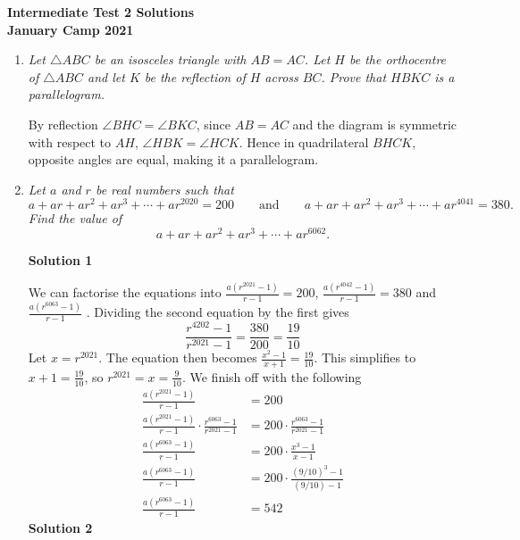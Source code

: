 \documentclass{article}
\begin{document}
\thispagestyle{empty}

\begin{center}
  \textbf{\Large Intermediate Test 2 Solutions}
  \\ \vspace{1em}
  \textbf{\large January Camp 2021}
\end{center}

\vspace{24pt}

\begin{enumerate}[1.]

  \item %
  {\itshape Let $\triangle ABC$ be an isosceles triangle with $AB = AC$. Let $H$ be the orthocentre of $\triangle ABC$ and let $K$ be the reflection of $H$ across $BC$. Prove that $HBKC$ is a parallelogram.}
  
  By reflection $\angle BHC = \angle BKC$, since $AB = AC$ and the diagram is symmetric with respect to $AH$, $\angle HBK = \angle HCK$. Hence in quadrilateral $BHCK$, opposite angles are equal, making it a parallelogram.
  
  \item %
  {\itshape Let $a$ and $r$ be real numbers such that
  \[ a +ar +ar^2 +ar^3 +\dotsb +ar^{2020} = 200 \qquad\text{and}\qquad a +ar +ar^2 +ar^3 +\dotsb +ar^{4041} = 380. \]
  Find the value of
  \[ a +ar +ar^2 +ar^3 +\dotsb +ar^{6062}. \]}
  
  \textbf{Solution 1}\newline

We can factorise the equations into $\frac{a(r^{2021} - 1)}{r - 1} = 200$, $\frac{a(r^{4042} - 1)}{r - 1} = 380$ and $\frac{a(r^{6063} - 1)}{r - 1}$ . Dividing the second equation by the first gives $$\frac{r^{4202} - 1}{r^{2021} - 1} = \frac{380}{200} = \frac{19}{10}$$ Let $x = r^{2021}$. The equation then becomes $\frac{x^2 - 1}{x + 1} = \frac{19}{10}$. This simplifies to $x + 1 = \frac{19}{10}$, so $r^{2021} = x = \frac{9}{10}$. We finish off with the following
\begin{align*}
\frac{a(r^{2021} - 1)}{r - 1} &= 200\\
\frac{a(r^{2021} - 1)}{r - 1}\cdot \frac{r^{6063} - 1}{r^{2021} - 1} &= 200\cdot \frac{r^{6063} - 1}{r^{2021} - 1}\\
\frac{a(r^{6063} - 1)}{r - 1} &= 200 \cdot \frac{x^3 - 1}{x - 1}\\
\frac{a(r^{6063} - 1)}{r - 1} &= 200 \cdot \frac{(9/10)^3 - 1}{(9/10) - 1}\\
\frac{a(r^{6063} - 1)}{r - 1} &= 542
\end{align*}
\textbf{Solution 2}\newline


\end{enumerate}
\end{document}
